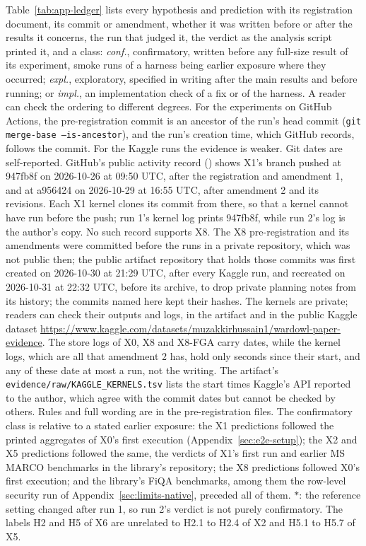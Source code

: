 Table~\ref{tab:app-ledger} lists every hypothesis and prediction with its registration document, its commit or
amendment, whether it was written before or after the results it concerns, the run that judged it, the verdict as the
analysis script printed it, and a class: \emph{conf.}, confirmatory, written before any full-size result of its experiment, smoke runs of a harness being earlier exposure where they occurred;
\emph{expl.}, exploratory, specified in writing after the main results and before running; or \emph{impl.}, an implementation
check of a fix or of the harness. A reader can check the ordering to different degrees. For the experiments on GitHub Actions,
the pre-registration commit is an ancestor of the run's head commit (\texttt{git merge-base --is-ancestor}), and the run's creation time, which
GitHub records, follows the commit. For the Kaggle runs the evidence is weaker. Git dates are self-reported. GitHub's public activity record () shows X1's branch pushed at 947fb8f on 2026-10-26 at 09:50 UTC, after the registration and amendment 1, and at a956424 on 2026-10-29 at 16:55 UTC, after amendment 2 and its revisions. Each X1 kernel clones its commit from there, so that a kernel cannot have run before the push; run 1's kernel log prints 947fb8f, while run 2's log is the author's copy. No such record supports X8. The X8
pre-registration and its amendments were committed before the runs in a private repository, which was not public then; the public artifact repository
that holds those commits was first created on 2026-10-30 at 21:29 UTC, after every Kaggle run, and recreated on 2026-10-31 at 22:32 UTC, before its archive, to drop private planning notes from its history; the commits named here kept their hashes. The kernels are private; readers can check their outputs and logs, in the artifact and in the public Kaggle
dataset \url{https://www.kaggle.com/datasets/muzakkirhussain1/wardowl-paper-evidence}. The store logs of X0, X8 and X8-FGA carry dates, while the kernel logs, which are all that amendment 2 has, hold only seconds since their start, and any of these date at most a run, not the writing. The artifact's \texttt{evidence/raw/KAGGLE\_KERNELS.tsv} lists the start times Kaggle's API reported to the author, which agree with the commit dates but cannot be checked by others. Rules and full wording are in the
pre-registration files. The confirmatory class is relative to a stated earlier exposure: the X1 predictions followed the printed
aggregates of X0's first execution (Appendix~\ref{sec:e2e-setup}); the X2 and X5 predictions followed the same, the verdicts of X1's first run and earlier MS MARCO benchmarks in the library's
repository; the X8 predictions followed X0's first execution; and the library's FiQA benchmarks, among them the row-level security run of
Appendix~\ref{sec:limits-native}, preceded all of them. $\ast$: the reference setting changed after run 1, so run 2's verdict is not purely confirmatory. The labels H2
and H5 of X6 are unrelated to H2.1 to H2.4 of X2 and H5.1 to H5.7 of X5.

